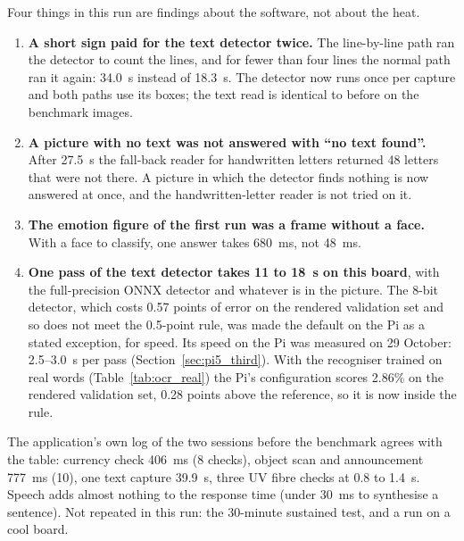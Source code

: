 Four things in this run are findings about the software, not about the heat.
\begin{enumerate}[noitemsep]
    \item \textbf{A short sign paid for the text detector twice.} The line-by-line path ran the detector to count the lines, and for fewer than four lines the normal path ran it again: 34.0~s instead of 18.3~s. The detector now runs once per capture and both paths use its boxes; the text read is identical to before on the benchmark images.
    \item \textbf{A picture with no text was not answered with ``no text found''.} After 27.5~s the fall-back reader for handwritten letters returned 48 letters that were not there. A picture in which the detector finds nothing is now answered at once, and the handwritten-letter reader is not tried on it.
    \item \textbf{The emotion figure of the first run was a frame without a face.} With a face to classify, one answer takes 680~ms, not 48~ms.
    \item \textbf{One pass of the text detector takes 11 to 18~s on this board}, with the full-precision ONNX detector and whatever is in the picture. The 8-bit detector, which costs 0.57 points of error on the rendered validation set and so does not meet the 0.5-point rule, was made the default on the Pi as a stated exception, for speed. Its speed on the Pi was measured on 29 October: 2.5--3.0~s per pass (Section~\ref{sec:pi5_third}). With the recogniser trained on real words (Table~\ref{tab:ocr_real}) the Pi's configuration scores 2.86\% on the rendered validation set, 0.28 points above the reference, so it is now inside the rule.
\end{enumerate}
The application's own log of the two sessions before the benchmark agrees with the table: currency check 406~ms (8 checks), object scan and announcement 777~ms (10), one text capture 39.9~s, three UV fibre checks at 0.8 to 1.4~s. Speech adds almost nothing to the response time (under 30~ms to synthesise a sentence). Not repeated in this run: the 30-minute sustained test, and a run on a cool board.


